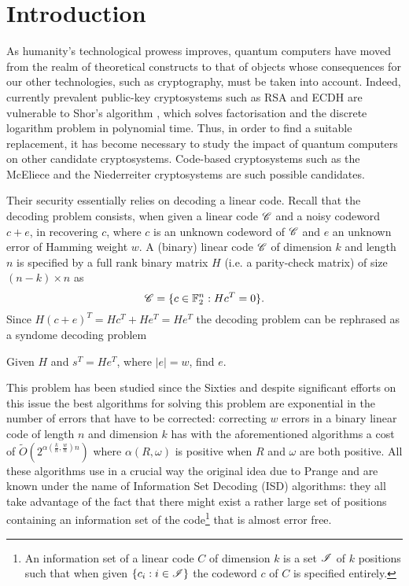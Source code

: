 \section{Introduction}

As humanity's technological prowess improves, quantum computers have moved from the realm of theoretical constructs to that of objects whose consequences for our other technologies, such as cryptography, must be taken into account. Indeed, currently prevalent public-key cryptosystems such as RSA and ECDH are vulnerable to Shor's algorithm \cite{S97}, which solves factorisation and the discrete logarithm problem in polynomial time. Thus, in order to find a suitable replacement, it has become necessary to study the impact of quantum computers on other candidate cryptosystems. Code-based cryptosystems such as the McEliece \cite{M78} and the Niederreiter \cite{N86} cryptosystems are such possible candidates. 

Their security essentially relies on decoding a linear code. 
Recall that the decoding problem consists, when given a linear code ${\mathscr C}$ and a noisy codeword $c+e$, in recovering $c$, where $c$ is an unknown codeword of 
${\mathscr C}$ and $e$ an unknown error of Hamming weight $w$. A (binary) linear code ${\mathscr C}$ of dimension $k$ and length $n$ is specified by 
a full rank binary matrix $H$ (i.e. a parity-check matrix) of size $(n-k)\times n$ as 
$${\mathscr C} = \{c \in \mathbb{F}_2^n:Hc^T = 0\}.$$
 Since $H(c+e)^T = Hc^T + He^T=He^T$ the decoding problem
can be rephrased as a syndome decoding problem

\begin{problem}
Given $H$ and $s^T = He^T$, where $|e| = w$, find $e$.
\end{problem}
This problem has been studied since the Sixties and despite significant efforts on this issue \cite{P62,S88,D91,B97b,MMT11,BLP11,BJMM12,MO15}
the best algorithms for solving this problem \cite{BJMM12,MO15} are exponential in the number of errors that have to be corrected:
correcting $w$ errors in a binary linear code of length $n$ and dimension $k$  has with the aforementioned algorithms a cost  of
$\tilde O(2^{\alpha(\frac{k}{n}, \frac{w}{n})n})$ where $\alpha(R,\omega)$ is positive when $R$ and $\omega$ 
 are both positive.
All these algorithms use in a crucial way the original idea due to Prange \cite{P62} and are known under the name
of Information Set Decoding (ISD) algorithms: they all take advantage of the fact that there might exist a rather large set of positions
containing an information set of the code\footnote{An information set of a linear code $C$ of dimension $k$ is a set ${\mathscr I}$ of $k$ positions such that 
when given $\{c_i:i \in {\mathscr I}\}$ the codeword $c$  of $C$ is specified entirely.}
that is almost error free.


